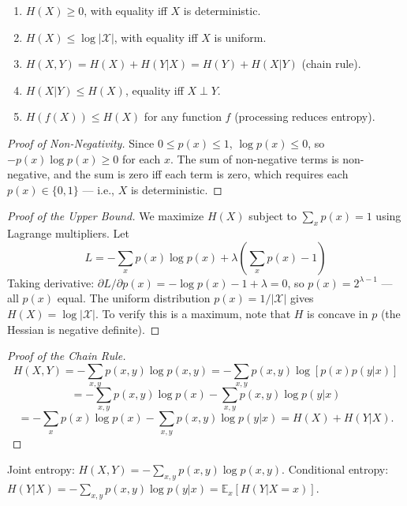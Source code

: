 \begin{theorem}
\label{thm:entropy-properties}
\begin{enumerate}
\item $H(X) \ge 0$, with equality iff $X$ is deterministic.
\item $H(X) \le \log |\mathcal{X}|$, with equality iff $X$ is uniform.
\item $H(X,Y) = H(X) + H(Y|X) = H(Y) + H(X|Y)$ (chain rule).
\item $H(X|Y) \le H(X)$, equality iff $X \perp Y$.
\item $H(f(X)) \le H(X)$ for any function $f$ (processing reduces entropy).
\end{enumerate}
\end{theorem}

\begin{proof}[Proof of Non-Negativity]
Since $0 \le p(x) \le 1$, $\log p(x) \le 0$, so $-p(x)\log p(x) \ge 0$ for each $x$. The sum of non-negative terms is non-negative, and the sum is zero iff each term is zero, which requires each $p(x) \in \{0,1\}$ — i.e., $X$ is deterministic.
\end{proof}

\begin{proof}[Proof of the Upper Bound]
We maximize $H(X)$ subject to $\sum_x p(x)=1$ using Lagrange multipliers. Let
\[
L = -\sum_x p(x)\log p(x) + \lambda\left(\sum_x p(x)-1\right)
\]
Taking derivative: $\partial L/\partial p(x) = -\log p(x) - 1 + \lambda = 0$, so $p(x) = 2^{\lambda-1}$ — all $p(x)$ equal. The uniform distribution $p(x) = 1/|\mathcal{X}|$ gives $H(X) = \log |\mathcal{X}|$. To verify this is a maximum, note that $H$ is concave in $p$ (the Hessian is negative definite).
\end{proof}

\begin{proof}[Proof of the Chain Rule]
\[
H(X,Y) = -\sum_{x,y} p(x,y) \log p(x,y)
= -\sum_{x,y} p(x,y) \log[p(x)p(y|x)]
\]
\[
= -\sum_{x,y} p(x,y)\log p(x) - \sum_{x,y} p(x,y)\log p(y|x)
\]
\[
= -\sum_x p(x)\log p(x) - \sum_{x,y} p(x,y)\log p(y|x) = H(X) + H(Y|X).
\]
\end{proof}

\begin{definition}
Joint entropy: $H(X,Y) = -\sum_{x,y} p(x,y)\log p(x,y)$.
Conditional entropy: $H(Y|X) = -\sum_{x,y} p(x,y)\log p(y|x) = \mathbb{E}_x[H(Y|X=x)]$.
\end{definition}

